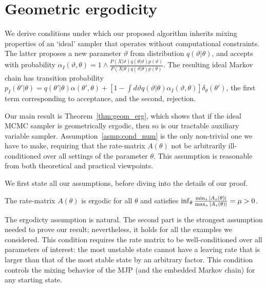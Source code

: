 \newpage
\section{Geometric ergodicity}
We derive conditions under which our proposed algorithm
inherits mixing properties of an `ideal' sampler that operates without
computational constraints. The latter proposes a new parameter $\vartheta$
from distribution $q(\vartheta|\theta)$, and accepts with probability 
$\alpha_I(\vartheta,\theta) = 1 \wedge \frac{P(X | \vartheta)q(\theta| \vartheta)p(\vartheta)}
      {P(X | \theta)q(\vartheta|\theta)p(\theta)}$. The resulting ideal
Markov chain has transition probability 
$p_I(\theta'|\theta) = q(\theta'|\theta)\alpha(\theta',\theta) + \left[1-\int d\vartheta
q(\vartheta|\theta)\alpha_I(\vartheta,\theta)\right]\delta_\theta(\theta')$, the first
term corresponding to acceptance, and the second, rejection.

Our main result is Theorem~\ref{thm:geom_erg}, which shows that if the ideal MCMC 
sampler is geometrically ergodic, then so is our tractable auxiliary
variable sampler. Assumption~\ref{asmp:cond_num} is the only non-trivial 
one we have to make, requiring that the rate-matrix $A(\theta)$ not be 
arbitrarily ill-conditioned over all
settings of the parameter $\theta$. This assumption is reasonable from
both theoretical and practical viewpoints.

We first state all our assumptions, before diving into the details
of our proof.
\begin{assumption}
  The rate-matrix $A(\theta)$ is ergodic for all $\theta$ and satisfies 
  $\inf_\theta \frac{{\min_s |A_s(\theta)|}}{{\max_s |A_s(\theta)|}} = \mu > 0$.
  \label{asmp:cond_num}
\end{assumption}
\noindent The ergodicty assumption is natural. The second part is the
strongest assumption needed to prove our result; nevertheless, it holds 
for all the examples we considered. This condition requires the rate 
matrix to be well-conditioned over all parameters of interest: the most 
unstable state cannot have a leaving rate that is larger than that of
the most stable state by an arbitrary factor. This condition controls the
mixing behavior of the MJP (and the embedded Markov chain) for any 
starting state. 

